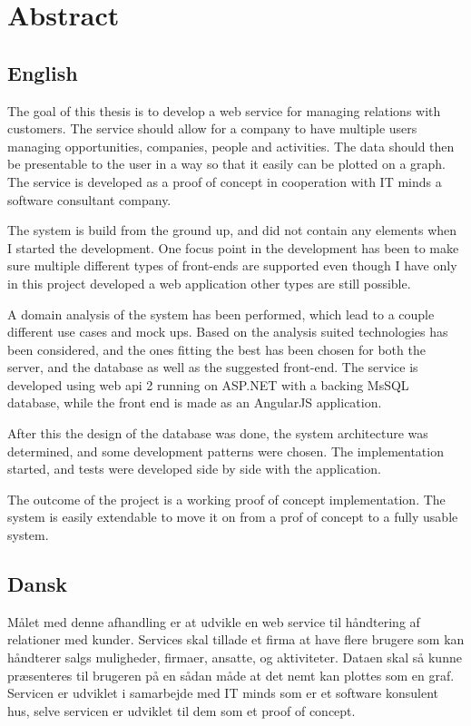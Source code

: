 \chapter{Abstract}
\label{chap:Abstract}

\section*{English}
The goal of this thesis is to develop a web service for managing relations with
customers. The service should allow for a company to have multiple users
managing opportunities, companies, people and activities. The data should then
be presentable to the user in a way so that it easily can be plotted on a graph.
The service is developed as a proof of concept in cooperation with IT minds a software consultant
company.

The system is build from the ground up, and did not contain any elements when I
started the development. One focus point in the development has been to
make sure multiple different types of front-ends are supported even though I
have only in this project developed a web application other types are still possible.

A domain analysis of the system has been performed, which lead to a couple
different use cases and mock ups. Based on the analysis suited technologies has
been considered, and the ones fitting the best has been chosen for both the
server, and the database as well as the suggested front-end. The service is
developed using web api 2 running on ASP.NET with a backing MsSQL database,
while the front end is made as an AngularJS application. 

After this the design of the database was done, the system architecture was
determined, and some development patterns were chosen. The implementation started,
and tests were developed side by side with the application. 

The outcome of the project is a working proof of concept implementation. The
system is easily extendable to move it on from a prof of concept to a fully
usable system. 

\clearpage
\section*{Dansk}
Målet med denne afhandling er at udvikle en web service til håndtering af
relationer med kunder. Services skal tillade et firma at have flere brugere
som kan håndterer salgs muligheder, firmaer, ansatte, og aktiviteter. Dataen
skal så kunne præsenteres til brugeren på en sådan måde at det nemt kan
plottes som en graf. Servicen er udviklet i samarbejde med IT minds som er et
software konsulent hus, selve servicen er udviklet til dem som et proof of concept.

